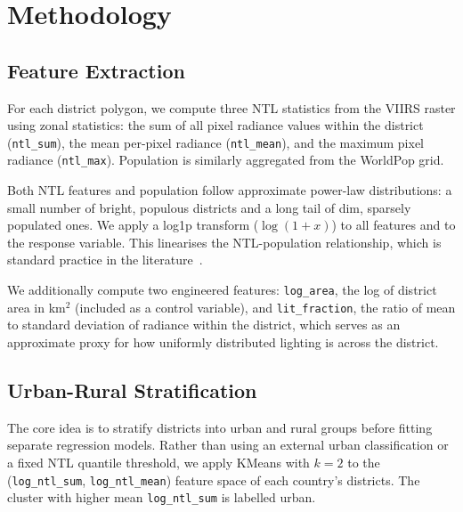 \documentclass[conference]{IEEEtran}
\begin{document}
\section{Methodology}

\subsection{Feature Extraction}

For each district polygon, we compute three NTL statistics from the VIIRS raster using zonal statistics: the sum of all pixel radiance values within the district (\texttt{ntl\_sum}), the mean per-pixel radiance (\texttt{ntl\_mean}), and the maximum pixel radiance (\texttt{ntl\_max}). Population is similarly aggregated from the WorldPop grid.

Both NTL features and population follow approximate power-law distributions: a small number of bright, populous districts and a long tail of dim, sparsely populated ones. We apply a log1p transform ($\log(1+x)$) to all features and to the response variable. This linearises the NTL-population relationship, which is standard practice in the literature~\cite{sutton1997,elvidge2021}.

We additionally compute two engineered features: \texttt{log\_area}, the log of district area in km$^2$ (included as a control variable), and \texttt{lit\_fraction}, the ratio of mean to standard deviation of radiance within the district, which serves as an approximate proxy for how uniformly distributed lighting is across the district.

\subsection{Urban-Rural Stratification}

The core idea is to stratify districts into urban and rural groups before fitting separate regression models. Rather than using an external urban classification or a fixed NTL quantile threshold, we apply KMeans with $k{=}2$ to the (\texttt{log\_ntl\_sum}, \texttt{log\_ntl\_mean}) feature space of each country's districts. The cluster with higher mean \texttt{log\_ntl\_sum} is labelled urban.
\end{document}

